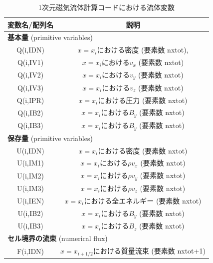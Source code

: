 \begin{table}[h]
\begin{center}
\caption{1次元磁気流体計算コードにおける流体変数}
\begin{tabular}{|c|c|}
    \hline
    変数名/配列名 & 説明 \\
    \hline
    \hline
    \multicolumn{2}{|l|}{ {\bf 基本量} (primitive variables)} \\
    \hline
    {\ttfamily Q(i,IDN)} & $x=x_i$における密度 (要素数 {\ttfamily nxtot}),   \\
    \hline
    {\ttfamily Q(i,IV1)} & $x=x_i$における$v_x$ (要素数 {\ttfamily nxtot}) \\
    \hline
    {\ttfamily Q(i,IV2)} & $x=x_i$における$v_y$ (要素数 {\ttfamily nxtot}) \\
    \hline
    {\ttfamily Q(i,IV3)} & $x=x_i$における$v_z$ (要素数 {\ttfamily nxtot}) \\
    \hline
    {\ttfamily Q(i,IPR)} & $x=x_i$における圧力 (要素数 {\ttfamily nxtot}) \\
    \hline
    {\ttfamily Q(i,IB2)} & $x=x_i$における$B_y$ (要素数 {\ttfamily nxtot}) \\
    \hline
    {\ttfamily Q(i,IB3)} & $x=x_i$における$B_y$ (要素数 {\ttfamily nxtot}) \\
    \hline
    \multicolumn{2}{|l|}{ {\bf 保存量} (primitive variables) } \\
    \hline
    {\ttfamily U(i,IDN)} & $x=x_i$における密度 (要素数 {\ttfamily nxtot}) \\
    \hline
    {\ttfamily U(i,IM1)} & $x=x_i$における$\rho v_x$ (要素数 {\ttfamily nxtot}) \\
    \hline
    {\ttfamily U(i,IM2)} & $x=x_i$における$\rho v_y$ (要素数 {\ttfamily nxtot}) \\
    \hline
    {\ttfamily U(i,IM3)} & $x=x_i$における$\rho v_z$ (要素数 {\ttfamily nxtot}) \\
    \hline
    {\ttfamily U(i,IEN)} & $x=x_i$における全エネルギー (要素数 {\ttfamily nxtot}) \\
    \hline
    {\ttfamily U(i,IB2)} & $x=x_i$における$B_y$ (要素数 {\ttfamily nxtot}) \\
    \hline
    {\ttfamily U(i,IB3)} & $x=x_i$における$B_z$ (要素数 {\ttfamily nxtot}) \\
    \hline
    \multicolumn{2}{|l|}{ {\bf セル境界の流束} (numerical flux) } \\
    \hline
    {\ttfamily F(i,IDN)} & $x=x_{i+1/2}$における質量流束 (要素数 {\ttfamily nxtot+1}) \\

\end{tabular}
\end{center}
\end{table}
